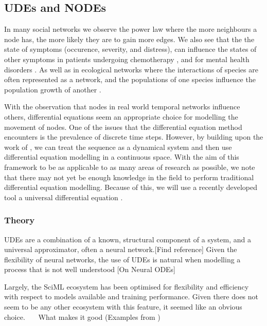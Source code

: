 \documentclass[12pt]{amsart}
\begin{document}
\subsection{UDEs and NODEs}
    In many social networks we observe the power law where the more neighbours a node has, the more likely they are to gain more edges\cite{zhao2012multi,garg2009evolution}. We also see that the the state of symptoms (occurence, severity, and distress), can influence the states of other symptoms in patients undergoing chemotherapy \cite{papachristou2019network,kalantari2022network}, and for mental health disorders \cite{contreras2020temporal}. As well as in ecological networks where the interactions of species are often represented as a network, and the populations of one species influence the population growth of another \cite{elton2001animal,volterra1927variazioni}.
            
    With the observation that nodes in real world temporal networks influence others, differential equations seem an appropriate choice for modelling the movement of nodes. One of the issues that the differential equation method encounters is the prevalence of discrete time steps. However, by building upon the work of \cite{sanna2021link}, we can treat the sequence as a dynamical system and then use differential equation modelling in a continuous space. With the aim of this framework to be as applicable to as many areas of research as possible, we note that there may not yet be enough knowledge in the field to perform traditional differential equation modelling. Because of this, we will use a recently developed tool a universal differential equation \cite{SciML_C_Rak}.

    \subsubsection{Theory}
        UDEs are a combination of a known, structural component of a system, and a universal approximator, often a neural network.[Find reference]
        Given the flexibility of neural networks, the use of UDEs is natural when modelling a process that is not well understood [On Neural ODEs]
        
        Largely, the SciML ecosystem has been optimised for flexibility and efficiency with respect to models available 
        and training performance. Given there does not seem to be any other ecosystem with this feature, it seemed like 
        an obvious choice. ~~~What makes it good (Examples from \cite{SciML_C_Rak})  
    
\end{document}
